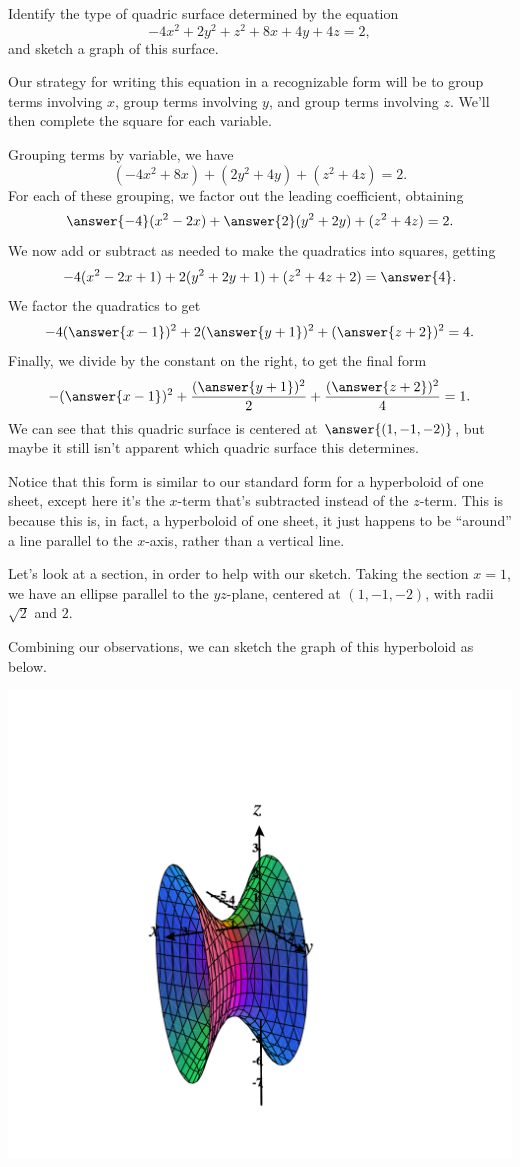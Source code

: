 \documentclass{ximera}
\begin{document}
\begin{example}
Identify the type of quadric surface determined by the equation
\[
-4x^2 + 2y^2 + z^2 + 8x + 4y+4z = 2,
\]
and sketch a graph of this surface.

Our strategy for writing this equation in a recognizable form will be to group terms involving $x$, group terms involving $y$, and group terms involving $z$. We'll then complete the square for each variable.

Grouping terms by variable, we have
\[
(-4x^2+8x) + (2y^2 + 4y) + (z^2 + 4z) = 2.
\]
For each of these grouping, we factor out the leading coefficient, obtaining
\[
\answer{-4}(x^2-2x) + \answer{2}(y^2 + 2y) + (z^2 + 4z) = 2.
\]
We now add or subtract as needed to make the quadratics into squares, getting
\[
-4(x^2-2x + 1) + 2(y^2 + 2y + 1) + (z^2 + 4z + 2) = \answer{4}.
\]
We factor the quadratics to get
\[
-4(\answer{x-1})^2 + 2(\answer{y+1})^2 + (\answer{z+2})^2 = 4.
\]
Finally, we divide by the constant on the right, to get the final form
\[
-(\answer{x-1})^2 + \frac{(\answer{y+1})^2}{2} + \frac{(\answer{z+2})^2}{4} = 1.
\]
We can see that this quadric surface is centered at $\answer{(1,-1,-2)}$, but maybe it still isn't apparent which quadric surface this determines.

Notice that this form is similar to our standard form for a hyperboloid of one sheet, except here it's the $x$-term that's subtracted instead of the $z$-term. This is because this is, in fact, a hyperboloid of one sheet, it just happens to be ``around'' a line parallel to the $x$-axis, rather than a vertical line.

Let's look at a section, in order to help with our sketch. Taking the section $x = 1$, we have an ellipse parallel to the $yz$-plane, centered at $(1,-1,-2)$, with radii $\sqrt{2}$ and $2$.

Combining our observations, we can sketch the graph of this hyperboloid as below.

\begin{image}
\includegraphics[width = \textwidth]{CalcPlot3D-shifted_hyperboloid}
\end{image}
\end{example}
\end{document}
